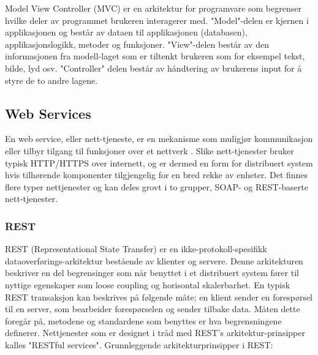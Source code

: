 \documentclass[../main.tex]{subfiles}
\begin{document}
Model View Controller (MVC) er en arkitektur for programvare som begrenser hvilke deler av programmet brukeren interagerer med. "Model"-delen er kjernen i applikasjonen og består av dataen til applikasjonen (databasen), applikasjonslogikk, metoder og funksjoner. "View"-delen består av den informasjonen fra modell-laget som er tiltenkt brukeren som for eksempel tekst, bilde, lyd osv. "Controller" delen består av håndtering av brukerens input for å styre de to andre lagene. 

\subsection{Web Services}

En web service, eller nett-tjeneste, er en mekanisme som muligjør kommunikasjon eller tilbyr tilgang til funksjoner  over et nettverk . Slike nett-tjenester bruker typisk HTTP/HTTPS over internett, og er dermed en form for distribuert system hvis tilhørende komponenter tilgjengelig for en bred rekke av enheter. Det finnes flere typer nettjenester og kan deles grovt i to grupper, SOAP- og REST-baserte nett-tjenester.  

\subsubsection{REST}

REST (Representational State Transfer) er en ikke-protokoll-spesifikk dataoverførings-arkitektur bestående av klienter og servere. Denne arkitekturen beskriver en del begrensinger som når benyttet i et distribuert system fører til nyttige egenskaper som loose coupling og horisontal skalerbarhet.  En typisk REST transaksjon kan beskrives på følgende måte; en klient sender en forespørsel til en server, som bearbeider forespørselen og sender tilbake data. Måten dette foregår på, metodene og standardene som benyttes er hva begrensningene definerer. Nettjenester som er designet i tråd med REST’s arkitektur-prinsipper kalles "RESTful services".\newline
\newline
Grunnleggende arkitekturprinsipper i REST:
\end{document}
